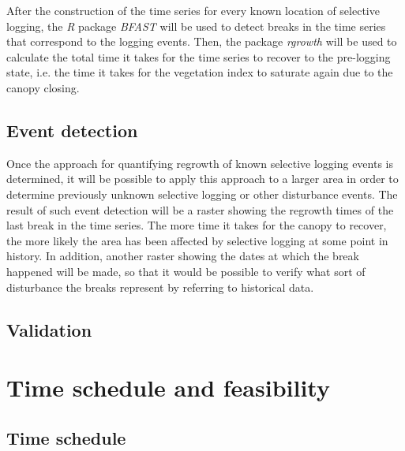 \documentclass[a4paper,10pt]{article}
\begin{document}
After the construction of the time series for every known location of selective logging, the \textit{R} package \textit{BFAST} will be used to detect breaks in the time series that correspond to the logging events. Then, the package \textit{rgrowth} will be used to calculate the total time it takes for the time series to recover to the pre-logging state, i.e. the time it takes for the vegetation index to saturate again due to the canopy closing.

\subsection{Event detection}

Once the approach for quantifying regrowth of known selective logging events is determined, it will be possible to apply this approach to a larger area in order to determine previously unknown selective logging or other disturbance events. The result of such event detection will be a raster showing the regrowth times of the last break in the time series. The more time it takes for the canopy to recover, the more likely the area has been affected by selective logging at some point in history. In addition, another raster showing the dates at which the break happened will be made, so that it would be possible to verify what sort of disturbance the breaks represent by referring to historical data.

\subsection{Validation}

\section{Time schedule and feasibility}

\subsection{Time schedule}
\end{document}
